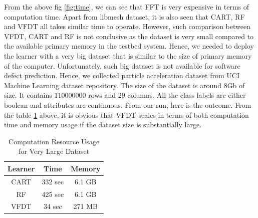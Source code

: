 \documentclass[sigplan]{acmart}\settopmatter{printfolios=true,printccs=false,printacmref=false}
\begin{document}
From the above fig \ref{fig:time}, we can see that FFT is very expensive in terms of computation time. Apart from libmesh dataset, it is also seen that CART, RF and VFDT all takes similar time to operate. However, such comparison between VFDT, CART and RF is not conclusive as the dataset is very small compared to the available primary memory in the testbed system. Hence, we needed to deploy the learner with a very big dataset that is similar to the size of primary memory of the computer. Unfortunately, such big dataset is not available for software defect prediction. Hence, we collected particle acceleration dataset from UCI Machine Learning dataset repository. The size of the dataset is around $8$Gb of size. It contains $110000000$ rows and $29$ columns. All the class labels are either boolean and attributes are continuous. From our run, here is the outcome. From the table \ref{higgs} above, it is obvious that VFDT scales in terms of both computation time and memory usage if the dataset size is substantially large.

\begin{table}
	\begin{tabular}{|c|c|c|}
		\hline 
		\textbf{Learner} & \textbf{Time} & \textbf{Memory} \\ 
		\hline 
		CART & 332 sec & 6.1 GB \\ 
		\hline 
		RF & 425 sec & 6.1 GB \\ 
		\hline 
		VFDT & 34 sec & 271 MB \\ 
		\hline 
	\end{tabular}
	\caption{Computation Resource Usage for Very Large Dataset} 
	\label{higgs}
\end{table}
\end{document}
